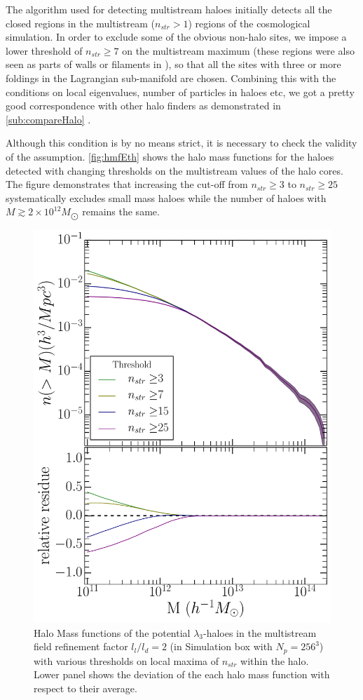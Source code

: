 {The algorithm used for detecting multistream haloes initially detects all the closed regions in the multistream ($n_{str} > 1$) regions of the cosmological simulation. In order to exclude some of the obvious non-halo sites, we impose a lower threshold of $n_{str} \geq 7$ on the multistream maximum (these regions were also seen as parts of walls or filaments in \citealt{Ramachandra2015} ), so that all the sites with three or more foldings in the Lagrangian sub-manifold are chosen. Combining this with the conditions on local eigenvalues, number of particles in haloes etc, we got a pretty good correspondence with other halo finders as demonstrated in \autoref{sub:compareHalo} . 

Although this condition is by no means strict, it is necessary to check the validity of the assumption. \autoref{fig:hmfEth} shows the halo mass functions for the haloes detected with changing thresholds on the multistream values of the halo cores. The figure demonstrates that increasing the cut-off from $n_{str} \geq 3$ to $n_{str} \geq 25$ systematically excludes small mass
haloes while the number of haloes with $M  \gtrsim 2\times10^{12} M_{\bigodot}$  remains the same.}

 


\begin{figure}
\begin{minipage}[t]{.99\linewidth}
 \centering\includegraphics[width=10.cm]{Chapter5/Source_v2/fig7.pdf} 
\end{minipage}\hfill
\caption{Halo Mass functions of the potential $\lambda_3$-haloes in the multistream field refinement factor $l_l/l_d = 2$ (in Simulation box with $N_p = 256^3$) with various thresholds on local maxima of $n_{str}$ within the halo. Lower panel shows the deviation of the each halo mass function with respect to their average.}
\label{fig:hmfEth}
\end{figure}


